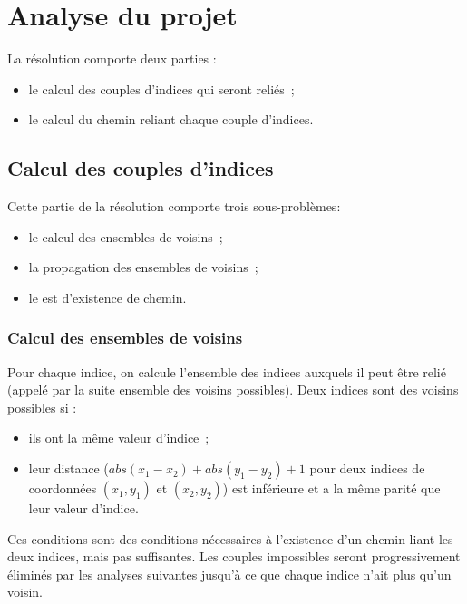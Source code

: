 \chapter{Analyse du projet}
La résolution comporte deux parties :\begin{itemize}
\item le calcul des couples d'indices qui seront reliés\ ;
\item le calcul du chemin reliant chaque couple d'indices.
\end{itemize}

\section{Calcul des couples d'indices }

Cette partie de la résolution comporte trois sous-problèmes:
\begin{itemize}
\item le calcul des ensembles de voisins\ ;
\item la propagation des ensembles de voisins\ ;
\item le est d'existence de chemin.
\end{itemize}

\subsection{Calcul des ensembles de voisins}

Pour chaque indice, on calcule l'ensemble des indices auxquels il peut être relié (appelé par la suite ensemble des voisins possibles).
Deux indices sont des voisins possibles si :
\begin{itemize}
\item ils ont la même valeur d'indice\ ;
\item leur distance ($abs(x_1-x_2)+abs(y_1-y_2)+1$ pour deux indices de coordonnées $(x_1,y_1)$ et $(x_2,y_2)$) est inférieure et a la même parité que leur valeur d'indice.
\end{itemize}

Ces conditions sont des conditions nécessaires à l'existence d'un chemin liant les deux indices, mais pas suffisantes.
Les couples impossibles seront progressivement éliminés par les analyses suivantes jusqu'à ce que chaque indice n'ait plus qu'un voisin.

